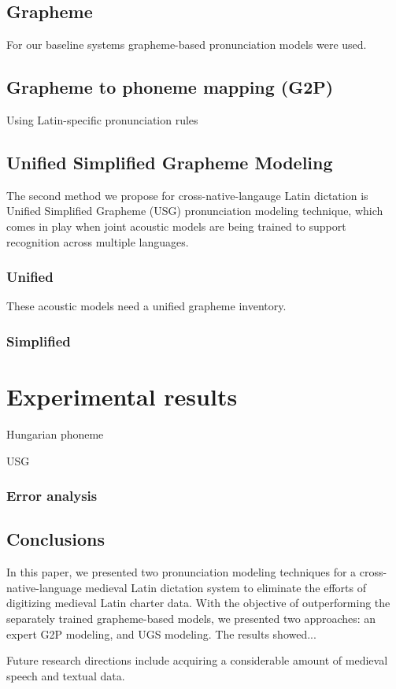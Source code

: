 \documentclass[runningheads,a4paper]{llncs}
\begin{document}
\subsection{Grapheme}
For our baseline systems grapheme-based pronunciation models were used.
\subsection{Grapheme to phoneme mapping (G2P)}\label{g2p}
Using Latin-specific pronunciation rules  
\subsection{Unified Simplified Grapheme Modeling}\label{usg}
The second method we propose for cross-native-langauge Latin dictation is Unified Simplified Grapheme (USG) pronunciation modeling technique, which comes in play when joint acoustic models are being trained to support recognition across multiple languages.
\subsubsection{Unified}
These acoustic models need a unified grapheme inventory.
\subsubsection{Simplified}
\section{Experimental results}
\begin{table}
\parbox{.45\linewidth}{
\centering
\caption{Hungarian phoneme}

}
\hfill
\parbox{.45\linewidth}{
\centering
\caption{USG}

}
\end{table}
\subsubsection{Error analysis}
\subsection{Conclusions}
In this paper, we presented two pronunciation modeling techniques for a cross-native-language medieval Latin dictation system to eliminate the efforts of digitizing medieval Latin charter data.
With the objective of outperforming the separately trained grapheme-based models, we presented two approaches: an expert G2P modeling, and UGS modeling.
The results showed...

Future research directions include acquiring a considerable amount of medieval speech and textual data.



\end{document}
